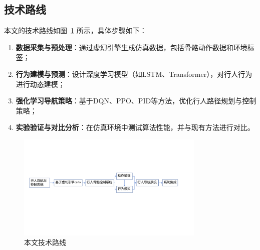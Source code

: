 \subsection{技术路线}

本文的技术路线如图~\ref{fig:tech_route} 所示，具体步骤如下：

\begin{enumerate}
    \item \textbf{数据采集与预处理}：通过虚幻引擎生成仿真数据，包括骨骼动作数据和环境标签；
    \item \textbf{行为建模与预测}：设计深度学习模型（如LSTM、Transformer），对行人行为进行动态建模；
    \item \textbf{强化学习导航策略}：基于DQN、PPO、PID等方法，优化行人路径规划与控制策略；
    \item \textbf{实验验证与对比分析}：在仿真环境中测试算法性能，并与现有方法进行对比。
\end{enumerate}

\begin{figure}[htbp]
    \centering
    \includegraphics[width=0.8\textwidth]{images/tech_route.pdf}
    \caption{本文技术路线}
    \label{fig:tech_route}
\end{figure}

